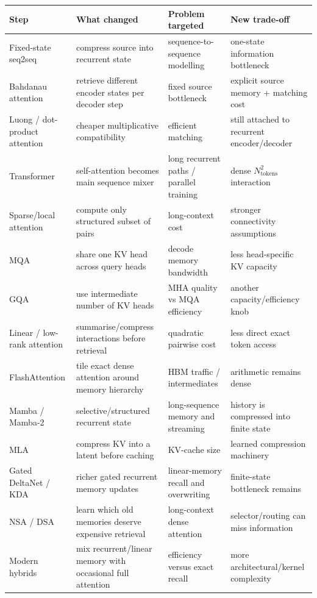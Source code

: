 \begin{center}
\scriptsize
\begin{tabularx}{.98\linewidth}{@{}L{.18\linewidth}L{.24\linewidth}L{.27\linewidth}Y@{}}
\toprule
\textbf{Step} & \textbf{What changed} & \textbf{Problem targeted} & \textbf{New trade-off} \\
\midrule
Fixed-state seq2seq & compress source into recurrent state & sequence-to-sequence modelling & one-state information bottleneck \\
Bahdanau attention & retrieve different encoder states per decoder step & fixed source bottleneck & explicit source memory + matching cost \\
Luong / dot-product attention & cheaper multiplicative compatibility & efficient matching & still attached to recurrent encoder/decoder \\
Transformer & self-attention becomes main sequence mixer & long recurrent paths / parallel training & dense $N_{\text{tokens}}^2$ interaction \\
Sparse/local attention & compute only structured subset of pairs & long-context cost & stronger connectivity assumptions \\
MQA & share one KV head across query heads & decode memory bandwidth & less head-specific KV capacity \\
GQA & use intermediate number of KV heads & MHA quality vs MQA efficiency & another capacity/efficiency knob \\
Linear / low-rank attention & summarise/compress interactions before retrieval & quadratic pairwise cost & less direct exact token access \\
FlashAttention & tile exact dense attention around memory hierarchy & HBM traffic / intermediates & arithmetic remains dense \\
Mamba / Mamba-2 & selective/structured recurrent state & long-sequence memory and streaming & history is compressed into finite state \\
MLA & compress KV into a latent before caching & KV-cache size & learned compression machinery \\
Gated DeltaNet / KDA & richer gated recurrent memory updates & linear-memory recall and overwriting & finite-state bottleneck remains \\
NSA / DSA & learn which old memories deserve expensive retrieval & long-context dense attention & selector/routing can miss information \\
Modern hybrids & mix recurrent/linear memory with occasional full attention & efficiency versus exact recall & more architectural/kernel complexity \\
\bottomrule
\end{tabularx}
\end{center}

